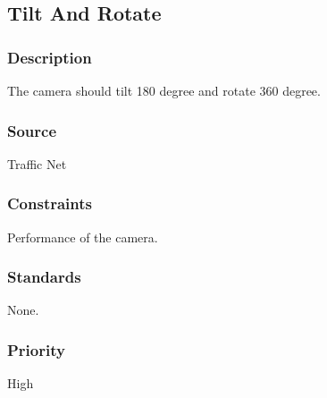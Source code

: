 \subsection{Tilt And Rotate}
\subsubsection{Description}
The camera should tilt 180 degree and rotate 360 degree.
\subsubsection{Source}
Traffic Net
\subsubsection{Constraints}
Performance of the camera.
\subsubsection{Standards}
None.
\subsubsection{Priority}
High

